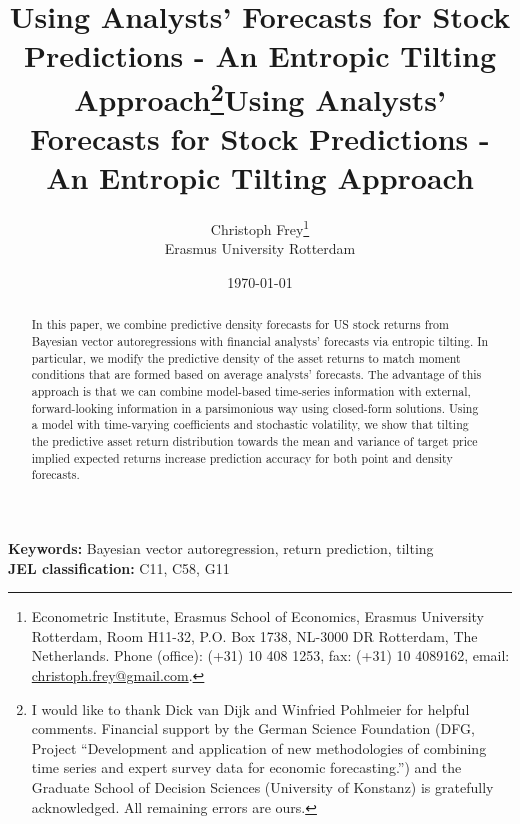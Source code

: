 \documentclass[11pt,a4paper]{article}
\title{\titleinfo}
\makeatletter
\newcommand{\titleinfo}{Using Analysts' Forecasts for Stock Predictions - An Entropic Tilting Approach}
\def\authora{Christoph Frey}
\def\affiliation{Erasmus University Rotterdam}
\def\email{\href{mailto:christoph.frey@gmail.com}{christoph.frey@gmail.com}}
\makeatother
\begin{document}
\begin{titlepage}
\title{\titleinfo \thanks{I would like to thank Dick van Dijk and Winfried Pohlmeier for helpful comments.
Financial support by the German Science Foundation (DFG, Project ``Development and application of new methodologies of combining time series and expert survey data for economic forecasting.'') and the Graduate School of Decision Sciences (University of Konstanz) is gratefully acknowledged. All remaining errors are ours.}}
\author{\Large \authora\thanks{Econometric Institute, Erasmus School of Economics, Erasmus University Rotterdam, Room H11-32, P.O. Box 1738, NL-3000 DR Rotterdam, The Netherlands. Phone (office): (+31) 10 408 1253, fax: (+31) 10 4089162, email: \email.} \\[0.2cm] \large \affiliation}  


\date{{{\today}} \\}
\maketitle
\thispagestyle{empty}

\begin{abstract}
\noindent In this paper, we combine predictive density forecasts for US stock returns from Bayesian vector autoregressions with financial analysts' forecasts via entropic tilting. In particular, we modify the predictive density of the asset returns to match moment conditions that are formed based on average analysts' forecasts. The advantage of this approach is that we can combine model-based time-series information with external, forward-looking information in a parsimonious way using closed-form solutions. Using a model with time-varying coefficients and stochastic volatility, we show that tilting the predictive asset return distribution towards the mean and variance of target price implied expected returns  increase prediction accuracy for both point and density forecasts. %
\end{abstract}
\vfill
\noindent \textbf{Keywords:} Bayesian vector autoregression, return prediction, tilting\\
\textbf{JEL classification:} C11, C58, G11
\end{titlepage}

\begin{center}
{\LARGE \title{\titleinfo}}
\end{center}
\end{document}
